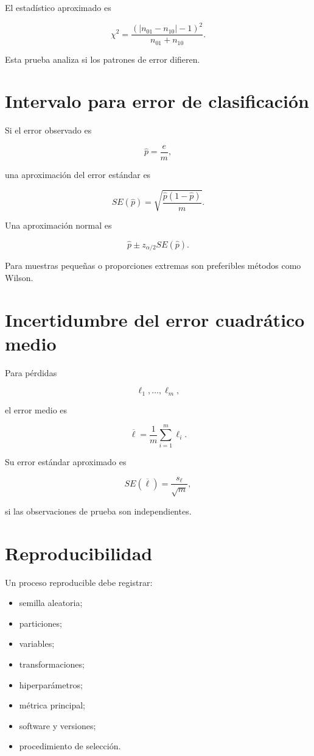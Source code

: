 \documentclass[
  spanish,
  11pt,
  letterpaper,
  DIV=11,
  numbers=noendperiod]{scrreprt}
\providecommand{\tightlist}{%
  \setlength{\itemsep}{0pt}\setlength{\parskip}{0pt}}
\theoremstyle{definition}
\theoremstyle{plain}
\theoremstyle{definition}
\theoremstyle{remark}
\begin{document}
El estadístico aproximado es

\[
\chi^2
=
\frac{
(|n_{01}-n_{10}|-1)^2
}{
n_{01}+n_{10}
}.
\]

Esta prueba analiza si los patrones de error difieren.

\section{Intervalo para error de
clasificación}\label{intervalo-para-error-de-clasificaciuxf3n}

Si el error observado es

\[
\widehat{p}
=
\frac{e}{m},
\]

una aproximación del error estándar es

\[
SE(\widehat{p})
=
\sqrt{
\frac{
\widehat{p}(1-\widehat{p})
}{
m
}
}.
\]

Una aproximación normal es

\[
\widehat{p}
\pm
z_{\alpha/2}
SE(\widehat{p}).
\]

Para muestras pequeñas o proporciones extremas son preferibles métodos
como Wilson.

\section{Incertidumbre del error cuadrático
medio}\label{incertidumbre-del-error-cuadruxe1tico-medio}

Para pérdidas

\[
\ell_1,\ldots,\ell_m,
\]

el error medio es

\[
\overline{\ell}
=
\frac{1}{m}
\sum_{i=1}^{m}\ell_i.
\]

Su error estándar aproximado es

\[
SE(\overline{\ell})
=
\frac{s_\ell}{\sqrt{m}},
\]

si las observaciones de prueba son independientes.

\section{Reproducibilidad}\label{reproducibilidad}

Un proceso reproducible debe registrar:

\begin{itemize}
\tightlist
\item
  semilla aleatoria;
\item
  particiones;
\item
  variables;
\item
  transformaciones;
\item
  hiperparámetros;
\item
  métrica principal;
\item
  software y versiones;
\item
  procedimiento de selección.
\end{itemize}
\end{document}
